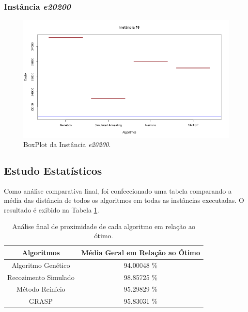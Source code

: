 \documentclass[portugues, brazil, a4paper,12pt]{article}
\begin{document}
		\subsubsection{Instância \textit{e20200}}
			\begin{figure}[H]
				\centering
				\includegraphics[width=1\linewidth]{img/18.png}
				\caption{BoxPlot da Instância \textit{e20200}.}
				\label{fig:e20200}
			\end{figure}
			
	
	\subsection{Estudo Estatísticos}
		Como análise comparativa final, foi confeccionado uma tabela comparando a média das distância de todos os algoritmos em todas as instâncias executadas. O resultado é exibido na Tabela \ref{tab:comparacaoFinal}.
		
	\begin{table}[h]
		\caption{Análise final de proximidade de cada algoritmo em relação ao ótimo.} \label{tab:comparacaoFinal}
		\centering
	    \begin{tabular}{c|c}
	    \hline
	    \textbf{Algoritmos}  &  \textbf{Média Geral em Relação ao Ótimo} \\ \hline \hline
	    Algoritmo Genético   &  94.00048 \%                \\
	    Recozimento Simulado &  98.85725 \%                \\
	    Método Reinício      &  95.29829 \%                \\
	    GRASP                &  95.83031 \%                \\ \hline
	    \end{tabular}
	\end{table}
	
\end{document}
